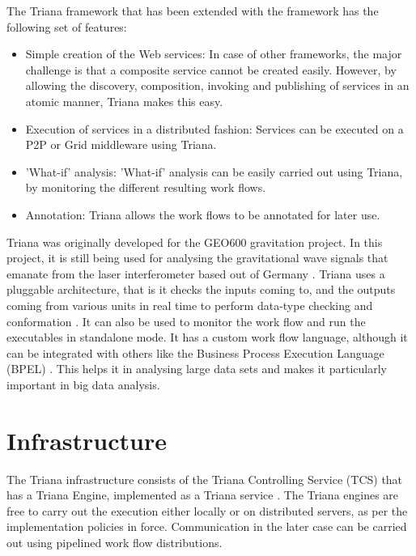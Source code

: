 \documentclass[9pt,twocolumn,twoside]{../../styles/osajnl}
\begin{document}
The Triana framework that has been extended with the framework has the 
following set of features: 

\begin{itemize} 

\item Simple creation of the Web services: In case of other frameworks, 
the major challenge is that a composite service cannot be created 
easily. However, by allowing the discovery, composition, invoking and 
publishing of services in an atomic manner, Triana makes this easy. 

\item Execution of services in a distributed fashion: Services can be 
executed on a P2P or Grid middleware using Triana. 

\item 'What-if' analysis: 'What-if' analysis can be easily carried out 
using Triana, by monitoring the different resulting work flows. 

\item Annotation: Triana allows the work flows to be annotated for later 
use. 

\end{itemize}

Triana was originally developed for the GEO600
gravitation project.  In this project, it is still being used for
analysing the gravitational wave signals that emanate from the laser
interferometer based out of Germany \cite{TrianaGEO600}.  Triana uses 
a pluggable architecture, that is it checks the inputs
coming to, and the outputs coming from various units in real time to
perform data-type checking and conformation \cite{TrianaDocumentation2}.  
It can also be used to monitor the work flow and run the executables in standalone mode.
  It has a custom work flow language, although it can
be integrated with others like the Business Process Execution Language
(BPEL) \cite{RMBDP-Book}.  This helps it in analysing large data sets and makes it
particularly important in big data analysis.

\section{Infrastructure}

The Triana infrastructure consists of the
Triana Controlling Service (TCS) that has a Triana Engine, implemented
as a Triana service \cite{TrianaDocumentation2}.  The Triana engines 
are free to carry out the execution either locally or on distributed servers,
as per the implementation policies in force.  Communication in the later case can
be carried out using pipelined work flow distributions.
\end{document}
